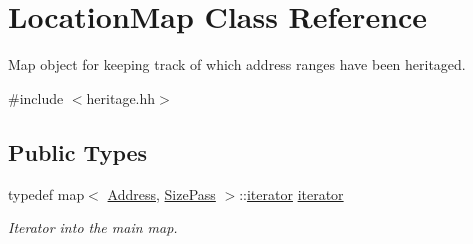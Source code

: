 \hypertarget{class_location_map}{}\section{Location\+Map Class Reference}
\label{class_location_map}


Map object for keeping track of which address ranges have been heritaged.  




{\ttfamily \#include $<$heritage.\+hh$>$}

\subsection*{Public Types}
\begin{DoxyCompactItemize}
\item 
typedef map$<$ \mbox{\hyperlink{class_address}{Address}}, \mbox{\hyperlink{struct_size_pass}{Size\+Pass}} $>$\+::\mbox{\hyperlink{class_location_map_a13612b4d0583b85205f3ad6476c2aef9}{iterator}} \mbox{\hyperlink{class_location_map_a13612b4d0583b85205f3ad6476c2aef9}{iterator}}
\begin{DoxyCompactList}\small\item\em Iterator into the main map. \end{DoxyCompactList}\end{DoxyCompactItemize}
